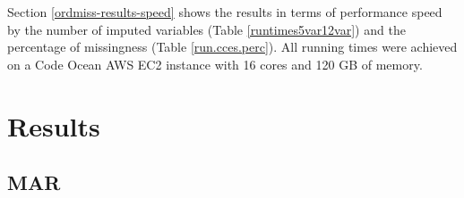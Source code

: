 \documentclass[12pt,econ]{sources/authesis}
\begin{document}
Section \ref{ordmiss-results-speed} shows the results in terms of performance speed by the number of imputed variables (Table \ref{runtimes5var12var}) and the percentage of missingness (Table \ref{run.cces.perc}). All running times were achieved on a Code Ocean AWS EC2 instance with 16 cores and 120 GB of memory.

\hypertarget{ordmiss-results}{%
\section{Results}\label{ordmiss-results}}

\hypertarget{ordmiss-results-mar}{%
\subsection{MAR}\label{ordmiss-results-mar}}
\end{document}
